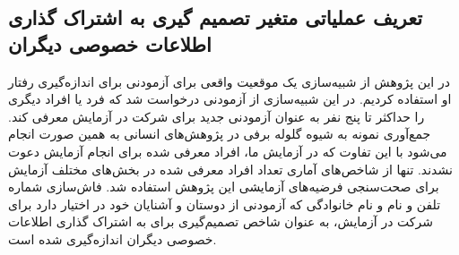 \subsection*{تعریف عملیاتی متغیر تصمیم گیری به اشتراک گذاری اطلاعات خصوصی دیگران}
در این پژوهش از شبیه‌سازی یک موقعیت واقعی برای آزمودنی برای اندازه‌گیری رفتار او استفاده کردیم. در این شبیه‌سازی 
از آزمودنی درخواست شد که فرد یا افراد دیگری را حداکثر تا پنج نفر به عنوان آزمودنی جدید برای شرکت 
در آزمایش معرفی کند. جمع‌آوری نمونه به شیوه گلوله برفی در پژوهش‌های انسانی  به همین صورت  انجام می‌شود با این 
تفاوت که در آزمایش ما، افراد معرفی شده برای انجام آزمایش دعوت نشدند. تنها از شاخص‌های آماری تعداد افراد 
معرفی شده در بخش‌های مختلف آزمایش برای صحت‌سنجی فرضیه‌های آزمایشی این پژوهش استفاده شد. فاش‌سازی
 شماره تلفن و نام و نام خانوادگی که آزمودنی از دوستان و آشنایان خود در اختیار دارد برای شرکت در آزمایش، به
 عنوان شاخص تصمیم‌گیری برای به اشتراک گذاری اطلاعات خصوصی دیگران اندازه‌گیری شده است.
